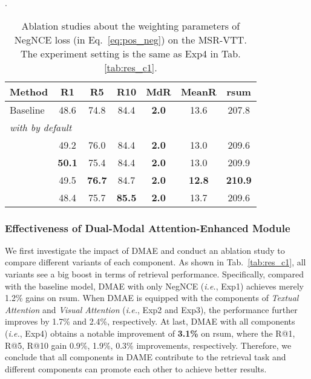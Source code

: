 \documentclass[sigconf]{acmart}
\begin{document}
\begin{table}[]
    \centering
    \caption{Ablation studies about the weighting parameters of NegNCE loss (in Eq.~\ref{eq:pos_neg}) on the MSR-VTT. The experiment setting is the same as Exp4 in Tab.\ref{tab:res_c1}.}.
    \label{tab:res_c1_weight}
    \renewcommand{\arraystretch}{0.8}\setlength\tabcolsep{2pt}\begin{tabular}{l| c c c c c c}
        \toprule
        {Method} & {R1} & {R5} & {R10} & {MdR} & {MeanR} & {rsum} \\ \toprule
        {Baseline} &48.6 &74.8	&84.4	&\textbf{2.0} &13.6	&207.8 \\ \midrule
        \multicolumn{7}{l}{\textit{with  by default}} \\  
        {} & 49.2	&76.0	&84.4	&\textbf{2.0}	&13.0	&209.6	\\
        {} & \textbf{50.1}	&75.4	&84.4	&\textbf{2.0}	&13.0	&209.9	\\
        {} &49.5 &\textbf{76.7} & 84.7 &\textbf{2.0}	&\textbf{12.8}	&\textbf{210.9} \\ 
        {} & 48.4 &75.7 &\textbf{85.5} &\textbf{2.0} &13.7 &209.6 \\ \bottomrule
    \end{tabular}
  \vspace{-0.3cm}
\end{table}



\subsubsection{Effectiveness of Dual-Modal Attention-Enhanced Module}
We first investigate the impact of DMAE and conduct an ablation study to compare different variants of each component. As shown in Tab.~\ref{tab:res_c1}, all variants see a big boost in terms of retrieval performance. 
Specifically, compared with the baseline model, 
DMAE with only NegNCE (\emph{i.e.}, Exp1) achieves merely 1.2\% gains on rsum. When DMAE is equipped with the components of \textit{Textual Attention} and \textit{Visual Attention} (\emph{i.e.}, Exp2 and Exp3), the performance further improves by 1.7\% and 2.4\%, respectively. At last, DMAE with all components (\emph{i.e.}, Exp4) obtains a notable improvement of \textbf{3.1\%} on rsum, where the R@1, R@5, R@10 gain 0.9\%, 1.9\%, 0.3\% improvements, respectively. Therefore, we conclude that all components in DAME contribute to the retrieval task and different components can promote each other to achieve better results.
\end{document}
